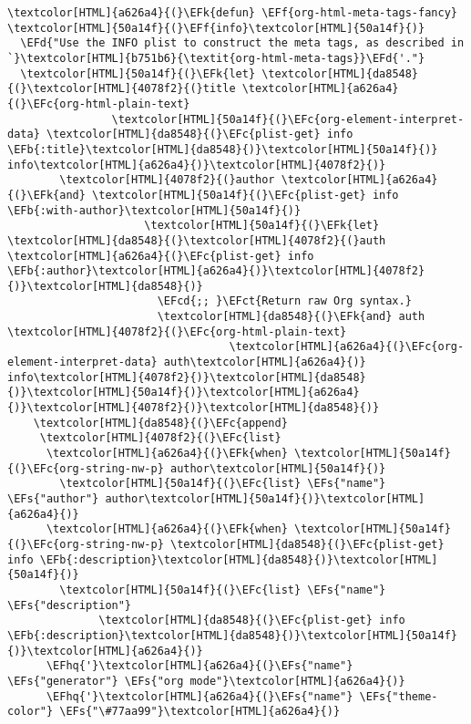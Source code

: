 \documentclass{scrartcl}
\newcommand{\EFk}[1]{\textcolor{EFk}{#1}} %
\newcommand{\EFd}[1]{\textcolor{EFd}{\textit{#1}}} %
\newcommand{\EFs}[1]{\textcolor{EFs}{#1}} %
\newcommand{\EFb}[1]{\textcolor{EFb}{#1}} %
\newcommand{\EFct}[1]{\textcolor{EFct}{#1}} %
\newcommand{\EFc}[1]{\textcolor{EFc}{#1}} %
\newcommand{\EFf}[1]{\textcolor{EFf}{#1}} %
\newcommand{\EFcd}[1]{\textcolor{EFcd}{#1}} %
\newcommand{\EFhq}[1]{\textcolor{EFhq}{#1}} %
\begin{document}
\begin{Code}
\begin{Verbatim}[]
\textcolor[HTML]{a626a4}{(}\EFk{defun} \EFf{org-html-meta-tags-fancy} \textcolor[HTML]{50a14f}{(}\EFf{info}\textcolor[HTML]{50a14f}{)}
  \EFd{"Use the INFO plist to construct the meta tags, as described in `}\textcolor[HTML]{b751b6}{\textit{org-html-meta-tags}}\EFd{'."}
  \textcolor[HTML]{50a14f}{(}\EFk{let} \textcolor[HTML]{da8548}{(}\textcolor[HTML]{4078f2}{(}title \textcolor[HTML]{a626a4}{(}\EFc{org-html-plain-text}
                \textcolor[HTML]{50a14f}{(}\EFc{org-element-interpret-data} \textcolor[HTML]{da8548}{(}\EFc{plist-get} info \EFb{:title}\textcolor[HTML]{da8548}{)}\textcolor[HTML]{50a14f}{)} info\textcolor[HTML]{a626a4}{)}\textcolor[HTML]{4078f2}{)}
        \textcolor[HTML]{4078f2}{(}author \textcolor[HTML]{a626a4}{(}\EFk{and} \textcolor[HTML]{50a14f}{(}\EFc{plist-get} info \EFb{:with-author}\textcolor[HTML]{50a14f}{)}
                     \textcolor[HTML]{50a14f}{(}\EFk{let} \textcolor[HTML]{da8548}{(}\textcolor[HTML]{4078f2}{(}auth \textcolor[HTML]{a626a4}{(}\EFc{plist-get} info \EFb{:author}\textcolor[HTML]{a626a4}{)}\textcolor[HTML]{4078f2}{)}\textcolor[HTML]{da8548}{)}
                       \EFcd{;; }\EFct{Return raw Org syntax.}
                       \textcolor[HTML]{da8548}{(}\EFk{and} auth \textcolor[HTML]{4078f2}{(}\EFc{org-html-plain-text}
                                  \textcolor[HTML]{a626a4}{(}\EFc{org-element-interpret-data} auth\textcolor[HTML]{a626a4}{)} info\textcolor[HTML]{4078f2}{)}\textcolor[HTML]{da8548}{)}\textcolor[HTML]{50a14f}{)}\textcolor[HTML]{a626a4}{)}\textcolor[HTML]{4078f2}{)}\textcolor[HTML]{da8548}{)}
    \textcolor[HTML]{da8548}{(}\EFc{append}
     \textcolor[HTML]{4078f2}{(}\EFc{list}
      \textcolor[HTML]{a626a4}{(}\EFk{when} \textcolor[HTML]{50a14f}{(}\EFc{org-string-nw-p} author\textcolor[HTML]{50a14f}{)}
        \textcolor[HTML]{50a14f}{(}\EFc{list} \EFs{"name"} \EFs{"author"} author\textcolor[HTML]{50a14f}{)}\textcolor[HTML]{a626a4}{)}
      \textcolor[HTML]{a626a4}{(}\EFk{when} \textcolor[HTML]{50a14f}{(}\EFc{org-string-nw-p} \textcolor[HTML]{da8548}{(}\EFc{plist-get} info \EFb{:description}\textcolor[HTML]{da8548}{)}\textcolor[HTML]{50a14f}{)}
        \textcolor[HTML]{50a14f}{(}\EFc{list} \EFs{"name"} \EFs{"description"}
              \textcolor[HTML]{da8548}{(}\EFc{plist-get} info \EFb{:description}\textcolor[HTML]{da8548}{)}\textcolor[HTML]{50a14f}{)}\textcolor[HTML]{a626a4}{)}
      \EFhq{'}\textcolor[HTML]{a626a4}{(}\EFs{"name"} \EFs{"generator"} \EFs{"org mode"}\textcolor[HTML]{a626a4}{)}
      \EFhq{'}\textcolor[HTML]{a626a4}{(}\EFs{"name"} \EFs{"theme-color"} \EFs{"\#77aa99"}\textcolor[HTML]{a626a4}{)}

\end{Verbatim}
\end{Code}
\end{document}
